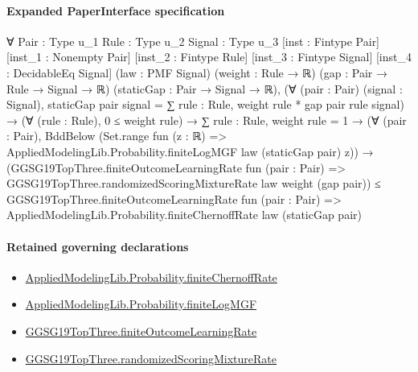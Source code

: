 \documentclass[10pt]{article}
\begin{document}
\paragraph{Expanded PaperInterface specification}
\begin{ReviewVerbatim}
∀ {Pair : Type u_1} {Rule : Type u_2} {Signal : Type u_3} [inst : Fintype Pair] [inst_1 : Nonempty Pair]
  [inst_2 : Fintype Rule] [inst_3 : Fintype Signal] [inst_4 : DecidableEq Signal] (law : PMF Signal) (weight : Rule → ℝ)
  (gap : Pair → Rule → Signal → ℝ) (staticGap : Pair → Signal → ℝ),
  (∀ (pair : Pair) (signal : Signal), staticGap pair signal = ∑ rule : Rule, weight rule * gap pair rule signal) →
    (∀ (rule : Rule), 0 ≤ weight rule) →
      ∑ rule : Rule, weight rule = 1 →
        (∀ (pair : Pair),
            BddBelow (Set.range fun (z : ℝ) => AppliedModelingLib.Probability.finiteLogMGF law (staticGap pair) z)) →
          (GGSG19TopThree.finiteOutcomeLearningRate fun (pair : Pair) =>
              GGSG19TopThree.randomizedScoringMixtureRate law weight (gap pair)) ≤
            GGSG19TopThree.finiteOutcomeLearningRate fun (pair : Pair) =>
              AppliedModelingLib.Probability.finiteChernoffRate law (staticGap pair)
\end{ReviewVerbatim}

\paragraph{Retained governing declarations}
\begin{itemize}\raggedright
\item \hyperlink{governing-declaration-6c54dc556c6a2667}{Applied\allowbreak{}Modeling\allowbreak{}Lib.\allowbreak{}Probability.\allowbreak{}finite\allowbreak{}Chernoff\allowbreak{}Rate}
\item \hyperlink{governing-declaration-2ca7dee39ae7371e}{Applied\allowbreak{}Modeling\allowbreak{}Lib.\allowbreak{}Probability.\allowbreak{}finite\allowbreak{}Log\allowbreak{}MGF}
\item \hyperlink{governing-declaration-6ccba7634ffd53cd}{GGSG19\allowbreak{}Top\allowbreak{}Three.\allowbreak{}finite\allowbreak{}Outcome\allowbreak{}Learning\allowbreak{}Rate}
\item \hyperlink{governing-declaration-efd7d403592e2b63}{GGSG19\allowbreak{}Top\allowbreak{}Three.\allowbreak{}randomized\allowbreak{}Scoring\allowbreak{}Mixture\allowbreak{}Rate}
\end{itemize}
\end{document}
